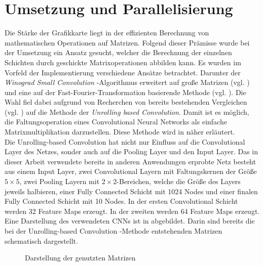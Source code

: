 \documentclass[../main.tex]{subfiles}
\begin{document}
\section{Umsetzung und Parallelisierung} \label{sec:cuda_umsetzung} 
Die Stärke der Grafikkarte liegt in der effizienten Berechnung von mathematischen Operationen auf Matrizen. Folgend dieser Prämisse wurde bei der Umsetzung ein Ansatz gesucht, welcher die Berechnung der einzelnen Schichten durch geschickte Matrixoperationen abbilden kann. Es wurden im Vorfeld der Implementierung verschiedene Ansätze betrachtet. Darunter der \emph{Winograd Small Convolution} -Algorithmus erweitert auf große Matrizen (vgl. \cite{WINOGRADSMALLCONV}) und eine auf der Fast-Fourier-Transformation basierende Methode (vgl. \cite{NVIDIA_WHITE_FFTCONV}). Die Wahl fiel dabei aufgrund von Recherchen von bereits bestehenden Vergleichen (vgl. \cite{UNROLLING_CONV}) auf die Methode der \emph{Unrolling based Convolution}. Damit ist es möglich, die Faltungsoperation eines Convolutional Neural Networks als einfache Matrixmultiplikation darzustellen. Diese Methode wird in  näher erläutert. \\ Die Unrolling-based Convolution hat nicht nur Einfluss auf die Convolutional Layer des Netzes, sonder auch auf die Pooling Layer und den Input Layer. Das in dieser Arbeit verwendete bereits in anderen Anwendungen erprobte Netz besteht aus einem Input Layer, zwei Convolutional Layern mit Faltungskernen der Größe $5\times 5$, zwei Pooling Layern mit $2\times 2$-Bereichen, welche die Größe des Layers jeweils halbieren, einer Fully Connected Schicht mit 1024 Nodes und einer finalen Fully Connected Schicht mit 10 Nodes. In der ersten Convolutional Schicht werden 32 Feature Maps erzeugt. In der zweiten werden 64 Feature Maps erzeugt. Eine Darstellung des verwendeten CNNs ist in  abgebildet. Darin sind bereits die bei der Unrolling-based Convolution -Methode entstehenden Matrizen schematisch dargestellt.\par 
\begin{figure}[!htbp]
	\centering
{}
\caption{Darstellung der genutzten Matrizen} \label{fig:matrixkonfiguration}
\end{figure}
\end{document}

